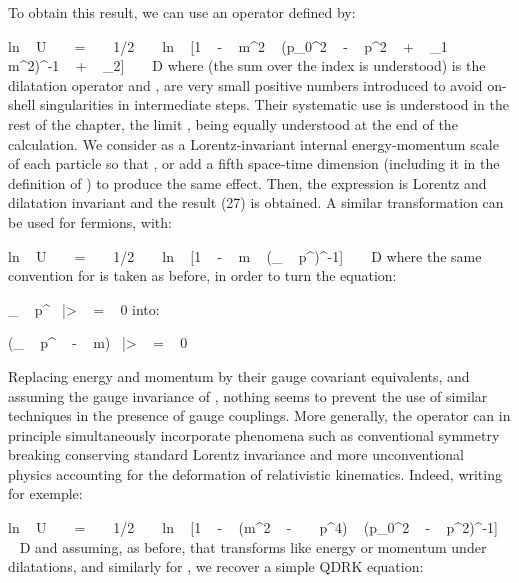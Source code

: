 \documentclass[a4paper,12pt,dvips]{article}
\begin{document}
To obtain this result, we can use an operator \coordHE{} defined by:

\equation
ln ~ U ~ ~ = ~ ~ 1/2 ~ ~ ln ~ [1 ~ - ~ m^2 ~ (p_0^2 ~ - ~ p^2 ~ + ~ \eta _1 ~ m^2)^{-1} ~ + ~ \eta _2] ~ ~ D
\endequation
\noindent
where \coordHE{} (the sum over the index \coordHE{} is understood) is the dilatation operator and \coordHE{} , \coordHE{} are very small positive numbers introduced to avoid on-shell singularities in intermediate steps. Their systematic use is understood in the rest of the chapter, the limit \coordHE{} , \coordHE{}  \coordHE{} being equally understood at the end of the calculation. We consider \coordHE{} as a Lorentz-invariant internal energy-momentum scale of each particle so that \coordHE{} , or add a fifth space-time dimension (including it in the definition of \coordHE{}) to produce the same effect. Then, the expression \coordHE{} is Lorentz and dilatation invariant and the result (27) is obtained. A similar transformation can be used for fermions, with:

\equation
ln ~ U ~ ~ = ~ ~ 1/2 ~ ~ ln ~ [1 ~ - ~ m ~ (\gamma _{\alpha } ~ p^{\alpha })^{-1}] ~ ~ D
\endequation
\noindent
where the same convention for \coordHE{} is taken as before, in order to turn the equation:

\equation
\gamma _{\alpha } ~ p^{\alpha }~ |\psi> ~ = ~ 0
\endequation
\noindent
into: 

\equation
(\gamma _{\alpha } ~ p^{\alpha } ~ - ~ m)~ |\psi> ~ = ~ 0
\endequation
\noindent

Replacing energy and momentum by their gauge covariant equivalents, and assuming the gauge invariance of \coordHE{}, nothing seems to prevent the use of similar techniques in the presence of gauge couplings. More generally, the operator \coordHE{} can in principle simultaneously incorporate phenomena such as conventional symmetry breaking conserving standard Lorentz invariance and more unconventional physics accounting for the deformation of relativistic kinematics. Indeed, writing for exemple:

\equation
ln ~ U ~ ~ = ~ ~ 1/2 ~ ~ ln ~ [1 ~ - ~ (m^2 ~ - ~ \epsilon ~ p^4) ~ (p_0^2 ~ - ~ p^2)^{-1}] ~ ~ D
\endequation
\noindent
and assuming, as before, that \coordHE{} transforms like energy or momentum under dilatations, and similarly for \coordHE{}, we recover a simple QDRK equation:
\end{document}
